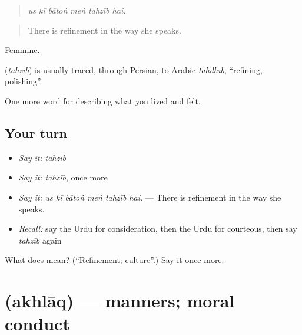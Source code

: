 \begin{quote}
     
\end{quote}

\begin{quote}
\emph{us kī bātoṅ meṅ tahzīb hai.}
\end{quote}

\begin{quote}
There is refinement in the way she speaks.
\end{quote}

Feminine.

\begin{cousinweb}
\textbf{} (\emph{tahzīb}) is usually traced, through Persian, to Arabic \emph{tahdhīb}, \textquotedblleft{}refining, polishing\textquotedblright{}.
\end{cousinweb}

\begin{grammarlens}[title={What you've built}]
One more word for describing what you lived and felt.
\end{grammarlens}

\subsection*{Your turn}
\begin{itemize}
\raggedright
  \item \emph{Say it:} \emph{tahzīb}
  \item \emph{Say it:} \emph{tahzīb}, once more
  \item \emph{Say it:} \emph{us kī bātoṅ meṅ tahzīb hai.} — There is refinement in the way she speaks.
  \item \emph{Recall:} say the Urdu for consideration, then the Urdu for courteous, then say \emph{tahzīb} again
\end{itemize}

\begin{tcolorbox}[breakable,colback=teal!4,colframe=teal!35!black,title={Before you move on}]
What does  mean? (\textquotedblleft{}Refinement; culture\textquotedblright{}.) Say it once more.
\end{tcolorbox}
\section[\texorpdfstring{\ur{اخلاق} (akhlāq)}{اخلاق (akhlāq)}]{ (akhlāq) — manners; moral conduct}

\label{lesson:UR-C461-akhlaq}



